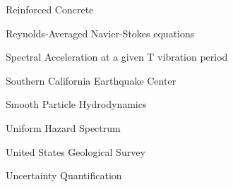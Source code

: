 \begin{description}[CABR]
\item[RC]{Reinforced Concrete}
\item[RANS]{Reynolds-Averaged Navier-Stokes equations}
\item[Sa(T)]{Spectral Acceleration at a given T vibration period}
\item[SCEC]{Southern California Earthquake Center}
\item[SPH]{Smooth Particle Hydrodynamics}
\item[UHS]{Uniform Hazard Spectrum}
\item[USGS]{United States Geological Survey}
\item[UQ]{Uncertainty Quantification}

\end{description}